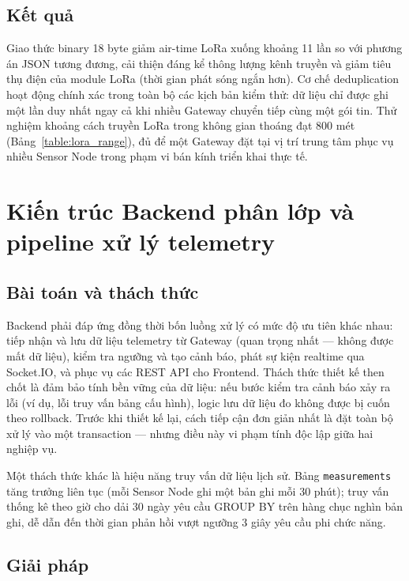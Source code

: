 \documentclass[../DoAn.tex]{subfiles}
\begin{document}
\subsection{Kết quả}
\label{subsection:5.2.3}

Giao thức binary 18 byte giảm air-time LoRa xuống khoảng 11 lần so với phương án JSON tương đương, cải thiện đáng kể thông lượng kênh truyền và giảm tiêu thụ điện của module LoRa (thời gian phát sóng ngắn hơn). Cơ chế deduplication hoạt động chính xác trong toàn bộ các kịch bản kiểm thử: dữ liệu chỉ được ghi một lần duy nhất ngay cả khi nhiều Gateway chuyển tiếp cùng một gói tin. Thử nghiệm khoảng cách truyền LoRa trong không gian thoáng đạt 800 mét (Bảng~\ref{table:lora_range}), đủ để một Gateway đặt tại vị trí trung tâm phục vụ nhiều Sensor Node trong phạm vi bán kính triển khai thực tế.

\section{Kiến trúc Backend phân lớp và pipeline xử lý telemetry}
\label{section:5.3}

\subsection{Bài toán và thách thức}
\label{subsection:5.3.1}

Backend phải đáp ứng đồng thời bốn luồng xử lý có mức độ ưu tiên khác nhau: tiếp nhận và lưu dữ liệu telemetry từ Gateway (quan trọng nhất — không được mất dữ liệu), kiểm tra ngưỡng và tạo cảnh báo, phát sự kiện realtime qua Socket.IO, và phục vụ các \gls{REST} \gls{API} cho Frontend. Thách thức thiết kế then chốt là đảm bảo tính bền vững của dữ liệu: nếu bước kiểm tra cảnh báo xảy ra lỗi (ví dụ, lỗi truy vấn bảng cấu hình), logic lưu dữ liệu đo không được bị cuốn theo rollback. Trước khi thiết kế lại, cách tiếp cận đơn giản nhất là đặt toàn bộ xử lý vào một transaction — nhưng điều này vi phạm tính độc lập giữa hai nghiệp vụ.

Một thách thức khác là hiệu năng truy vấn dữ liệu lịch sử. Bảng \texttt{measurements} tăng trưởng liên tục (mỗi Sensor Node ghi một bản ghi mỗi 30 phút); truy vấn thống kê theo giờ cho dải 30 ngày yêu cầu GROUP BY trên hàng chục nghìn bản ghi, dễ dẫn đến thời gian phản hồi vượt ngưỡng 3 giây yêu cầu phi chức năng.

\subsection{Giải pháp}
\label{subsection:5.3.2}
\end{document}
